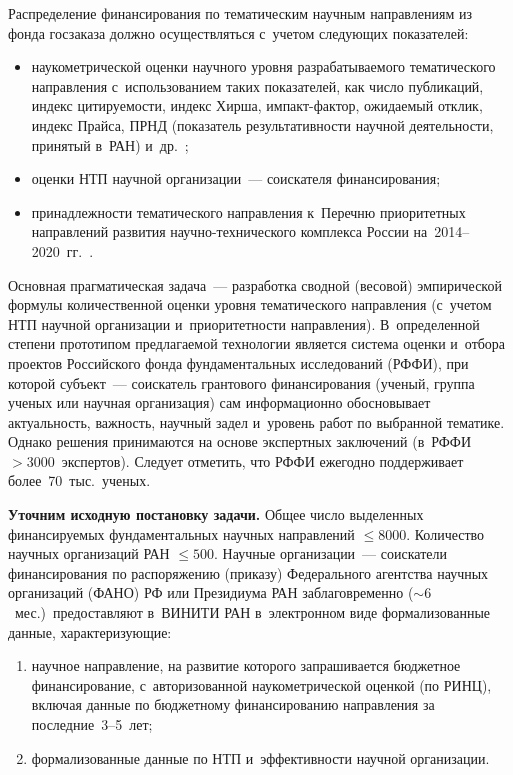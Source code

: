 \begin{multicols}{2}
    Распределение финансирования по тематическим научным на\-прав\-ле\-ни\-ям 
из фонда госзаказа должно осуществляться с~учетом следующих показателей:
    \begin{itemize}
    \item наукометрической оценки научного уровня разрабатываемого 
тематического направления с~использованием таких показателей, как чис\-ло 
публикаций, индекс цитируемости, индекс Хирша, им\-пакт-фак\-тор, 
ожидаемый отклик, индекс Прайса, ПРНД (показатель результативности 
научной деятельности, принятый в~РАН) и~др.~\cite{2-sun, 8-sun};
    \item  оценки НТП научной организации~--- соискателя финансирования;
\item  принадлежности тематического на\-прав\-ле\-ния к~Перечню приоритетных 
направлений развития на\-уч\-но-тех\-ни\-че\-ско\-го комплекса России 
на~2014--2020~гг.~\cite{9-sun}. 
\end{itemize}

    Основная прагматическая задача~--- разработка сводной (весовой) 
эмпирической формулы количественной оценки уровня тематического 
направления (с~учетом НТП научной организации и~приоритет\-ности 
направления). В~определенной степени прототипом предлагаемой технологии 
является сис\-те\-ма оценки и~отбора проектов Российского фонда 
фундаментальных исследований (РФФИ), при которой субъект~--- соискатель 
грантового финансирования (ученый, группа ученых или научная организация) 
сам информационно обосновывает актуальность, важ\-ность, научный задел 
и~уровень работ по выбранной тематике. Однако решения принимаются на 
основе экспертных заключений (в~РФФИ $> 3000$~экспертов). Следует 
отметить, что РФФИ ежегодно поддерживает более~70~тыс.\ ученых. 
    
    \textbf{Уточним исходную постановку задачи.} Общее число 
выделенных финансируемых фундаментальных научных на\-прав\-ле\-ний $\leq 
8000$. Количество научных организаций РАН $\leq 500$. Научные 
организации~--- соискатели финансирования по распоряжению (приказу) 
Федерального агентства научных организаций
(ФАНО) РФ или Президиума РАН заблаговременно ($\sim6$~мес.)\ 
предоставляют в~\mbox{ВИНИТИ} РАН в~электронном виде формализованные данные, 
характеризующие:
\begin{enumerate}[(1)]
\item научное на\-прав\-ле\-ние, на развитие которого 
запрашивается бюджетное финансирование, с~авторизованной 
наукометрической оценкой (по РИНЦ), включая данные по бюджетному 
финансированию направления за последние~3--5~лет; 
\item формализованные 
данные по НТП и~эффективности научной 
организации. 
\end{enumerate}


\end{multicols}
